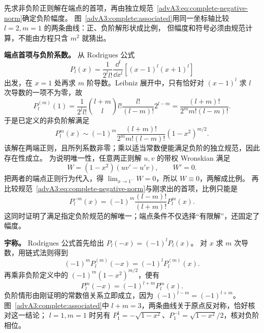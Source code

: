 先求非负阶正则解在端点的首项，再由独立规范~\eqref{advA3:eq:complete-negative-norm}确定负阶幅度。
图~\ref{advA3:complete:associated}用同一坐标轴比较 $l=2,m=1$ 的两条曲线：正、负阶解形状成比例，
但幅度和符号必须由规范计算，不能由方程只含 $m^2$ 就猜出。

\begin{qualityfigure}
\centering
{}
\end{qualityfigure}

\textbf{端点首项与负阶系数。} 从 Rodrigues 公式
\[
 P_l(x)=\frac1{2^ll!}\frac{\dd^l}{\dd x^l}[(x-1)^l(x+1)^l]
\]
出发，在 $x=1$ 处再求 $m$ 阶导数。Leibniz 展开中，只有恰好对 $(x-1)^l$ 求 $l$ 次导数的一项不为零，故
\[
 P_l^{(m)}(1)
 =\frac1{2^ll!}\binom{l+m}{l}l!\frac{l!}{(l-m)!}2^{l-m}
 =\frac{(l+m)!}{2^m m!(l-m)!}.
\]
于是已定义的非负阶解满足
\[
 P_l^m(x)\sim(-1)^m\frac{(l+m)!}{2^m m!(l-m)!}(1-x^2)^{m/2}.
\]
该解在两端正则，且所列系数非零；乘以适当常数便能满足负阶的独立规范，因此存在性成立。
为说明唯一性，任意两正则解 $u,v$ 的带权 Wronskian 满足
\[
 W=(1-x^2)(uv'-u'v),\qquad W'=0.
\]
把两者的端点正则行为代入，得 $\lim_{x\to1^-}W=0$，所以 $W\equiv0$，两解成比例。
再比较规范~\eqref{advA3:eq:complete-negative-norm}与刚求出的首项，比例只能是
\[
 \boxed{P_l^{-m}(x)=(-1)^m\frac{(l-m)!}{(l+m)!}P_l^m(x)}.
\]
这同时证明了满足指定负阶规范的解唯一；端点条件不仅选择“有限解”，还固定了幅度。

\textbf{宇称。} Rodrigues 公式首先给出 $P_l(-x)=(-1)^lP_l(x)$。
对 $x$ 求 $m$ 次导数，用链式法则得到
\[
 (-1)^mP_l^{(m)}(-x)=(-1)^lP_l^{(m)}(x).
\]
再乘非负阶定义中的 $(-1)^m(1-x^2)^{m/2}$，便有
\[
 \boxed{P_l^m(-x)=(-1)^{l+m}P_l^m(x)}.
\]
负阶情形由刚证明的常数倍关系立即成立，因为 $(-1)^{l-m}=(-1)^{l+m}$。
图~\ref{advA3:complete:associated}中 $l+m=3$，两条曲线关于原点反对称，恰好核对这一结论；
$l=1,m=1$ 时另有 $P_1^1=-\sqrt{1-x^2}$、$P_1^{-1}=\sqrt{1-x^2}/2$，核对负阶相位。

